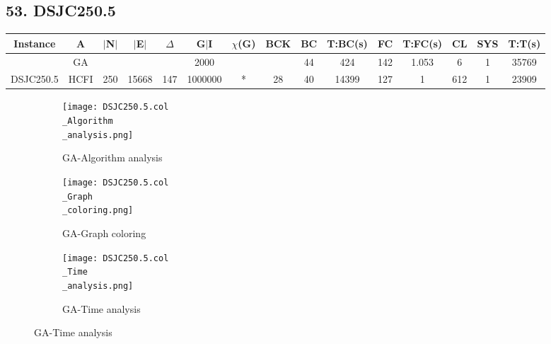 \documentclass[10pt]{article}
\begin{document}
\subsection*{\hspace{0,9073976cm} 53. DSJC250.5}
\begin{table}[H]
\centering
\begin{tabular}{|c|c|c|c|c|c|c|c|c|c|c|c|c|c|c|}
\hline
Instance& A &$|$N$|$ & $|$E$|$ & $\Delta$ & G$|$I & $\chi$(G) &BCK&BC & T:BC(s) & FC & T:FC(s) & CL & SYS & T:T(s) \\ \hline \hline

	&GA&       &                   &                     & 2000        &     \cellcolor{yellow} & {\cellcolor{yellow}}& {{\cellcolor{green}44}}
&424   &142        & 1.053                  &6                    &1          &35769        \\ \cline{2-2} \cline{6-6} \cline{9-15}
 \multirow{-2}{*}{DSJC250.5} &HCFI   &\multirow{-2}{*}{250}   &\multirow{-2}{*}{15668}     &\multirow{-2}{*}{147}     &1000000     &\multirow{-2}{*}{\cellcolor{yellow}*}      & \multirow{-2}{*}{\cellcolor{yellow}28}    &{\cellcolor{green}40}     &14399         &127    &1         &612    &1     &23909        \\ \hline 
\end{tabular}
\end{table}
\graphicspath{{./Core1/Solutions/GA/DSJC250.5.col}}
\begin{figure}[H]
\begin{subfigure}{.33\textwidth}
  \centering
  \texttt{[image: DSJC250.5.col\\\_Algorithm\\\_analysis.png]}
  \caption{GA-Algorithm analysis}
   \label{fig:subfig1}
\end{subfigure}%
\begin{subfigure}{.33\textwidth}
  \centering
  \texttt{[image: DSJC250.5.col\\\_Graph\\\_coloring.png]}
  \caption{GA-Graph coloring}
  \label{fig:subfig2}
\end{subfigure}
\begin{subfigure}{.33\textwidth}
  \centering
  \texttt{[image: DSJC250.5.col\\\_Time\\\_analysis.png]}
  \caption{GA-Time analysis}
  \end{subfigure}
\end{figure}
\end{document}
